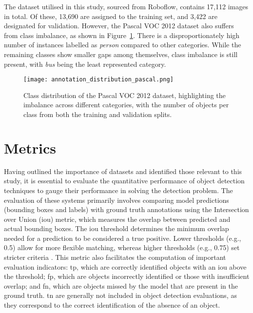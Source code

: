 The dataset utilised in this study, sourced from Roboflow, contains 17,112 images in total. Of these, 13,690 are assigned to the training set, and 3,422 are designated for validation. However, the Pascal VOC 2012 dataset also suffers from class imbalance, as shown in Figure~\ref{fig:class_distribution_pascal_voc}. There is a disproportionately high number of instances labelled as \textit{person} compared to other categories. While the remaining classes show smaller gaps among themselves, class imbalance is still present, with \textit{bus} being the least represented category.

\begin{figure}[!ht]
    \centering
    \texttt{[image: annotation\_distribution\_pascal.png]}
    \caption{Class distribution of the Pascal VOC 2012 dataset, highlighting the imbalance across different categories, with the number of objects per class from both the training and validation splits.}
    \label{fig:class_distribution_pascal_voc}%
\end{figure}

\section{Metrics}
\label{sec:4_metrics}

Having outlined the importance of datasets and identified those relevant to this study, it is essential to evaluate the quantitative performance of object detection techniques to gauge their performance in solving the detection problem. The evaluation of these systems primarily involves comparing model predictions (bounding boxes and labels) with ground truth annotations using the Intersection over Union (\gls{iou}) metric, which measures the overlap between predicted and actual bounding boxes. The \gls{iou} threshold determines the minimum overlap needed for a prediction to be considered a true positive. Lower thresholds (e.g., 0.5) allow for more flexible matching, whereas higher thresholds (e.g., 0.75) set stricter criteria \cite{coco}. This metric also facilitates the computation of important evaluation indicators: \gls{tp}, which are correctly identified objects with an \gls{iou} above the threshold; \gls{fp}, which are objects incorrectly identified or those with insufficient overlap; and \gls{fn}, which are objects missed by the model that are present in the ground truth. \gls{tn} are generally not included in object detection evaluations, as they correspond to the correct identification of the absence of an object.

